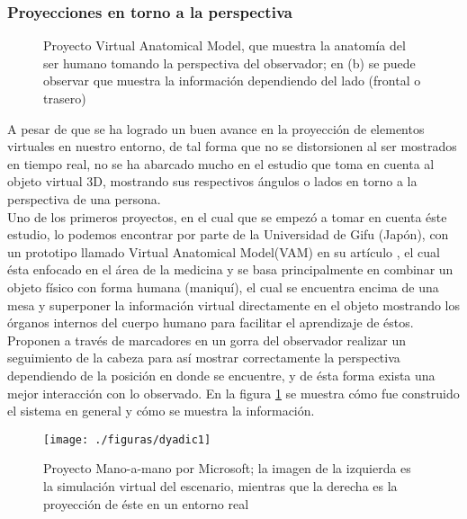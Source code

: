 \documentclass[a4paper,openright,12pt]{report}
\begin{document}
\subsubsection{Proyecciones en torno a la perspectiva}
\vspace*{5mm}
\begin{figure}[thb]
	\centering
	\caption[Proyecto Virtual Anatomical Model]{Proyecto Virtual Anatomical Model, que muestra la anatomía del ser humano tomando la perspectiva del observador; en (b) se puede observar que muestra la información dependiendo del lado (frontal o trasero) \citep{kondo2008}} \label{fig:vam}
\end{figure}
A pesar de que se ha logrado un buen avance en la proyección de elementos virtuales en nuestro entorno, de tal forma que no se distorsionen al ser mostrados en tiempo real, no se ha abarcado mucho en el estudio que toma en cuenta al objeto virtual 3D, mostrando sus respectivos ángulos o lados en torno a la perspectiva de una persona.\\
Uno de los primeros proyectos, en el cual que se empezó a tomar en cuenta éste estudio, lo podemos encontrar por parte de la Universidad de Gifu (Japón), con un prototipo llamado Virtual Anatomical Model(VAM) en su artículo \citep{kondo2008}, el cual ésta enfocado en el área de la medicina y se basa principalmente en combinar un objeto físico con forma humana (maniquí), el cual se encuentra encima de una mesa y superponer la información virtual directamente en el objeto mostrando los órganos internos del cuerpo humano para facilitar el aprendizaje de éstos. Proponen a través de marcadores en un gorra del observador realizar un seguimiento de la cabeza para así mostrar correctamente la perspectiva dependiendo de la posición en donde se encuentre, y de ésta forma exista una mejor interacción con lo observado. En la figura \ref{fig:vam} se muestra cómo fue construido el sistema en general y cómo se muestra la información.
\begin{figure}[htb]
	\centering
	\texttt{[image: ./figuras/dyadic1]}
	\caption[Proyecto Mano-a-mano por Microsoft\textregistered]{Proyecto Mano-a-mano por Microsoft\textregistered; la imagen de la izquierda es la simulación virtual del escenario, mientras que la derecha es la proyección de éste en un entorno real} \label{fig:perspectiva}
\end{figure}\\
\end{document}
